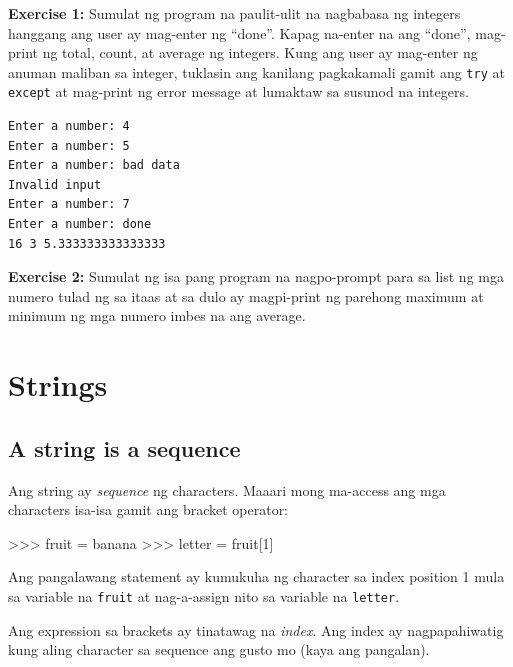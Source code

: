 \documentclass[10pt,]{book}
\newenvironment{Shaded}{}{}
\newcommand{\DecValTok}[1]{\textcolor[rgb]{0.25,0.63,0.44}{#1}}
\newcommand{\NormalTok}[1]{#1}
\newcommand{\OperatorTok}[1]{\textcolor[rgb]{0.40,0.40,0.40}{#1}}
\newcommand{\StringTok}[1]{\textcolor[rgb]{0.25,0.44,0.63}{#1}}
\begin{document}
\textbf{Exercise 1:} Sumulat ng program na paulit-ulit na nagbabasa ng
integers hanggang ang user ay mag-enter ng ``done''. Kapag na-enter na
ang ``done'', mag-print ng total, count, at average ng integers. Kung
ang user ay mag-enter ng anuman maliban sa integer, tuklasin ang
kanilang pagkakamali gamit ang \texttt{try} at \texttt{except} at
mag-print ng error message at lumaktaw sa susunod na integers.

{\small
\begin{verbatim}
Enter a number: 4
Enter a number: 5
Enter a number: bad data
Invalid input
Enter a number: 7
Enter a number: done
16 3 5.333333333333333
\end{verbatim}
}

\textbf{Exercise 2:} Sumulat ng isa pang program na nagpo-prompt para sa
list ng mga numero tulad ng sa itaas at sa dulo ay magpi-print ng
parehong maximum at minimum ng mga numero imbes na ang average.

\chapter{Strings}\label{strings}

\section{A string is a sequence}\label{a-string-is-a-sequence}

  

Ang string ay \emph{sequence} ng characters. Maaari mong ma-access ang
mga characters isa-isa gamit ang bracket operator:

\begin{Shaded}
\begin{Highlighting}[]
\OperatorTok{\textgreater{}\textgreater{}\textgreater{}}\NormalTok{ fruit }\OperatorTok{=} \StringTok{\textquotesingle{}banana\textquotesingle{}}
\OperatorTok{\textgreater{}\textgreater{}\textgreater{}}\NormalTok{ letter }\OperatorTok{=}\NormalTok{ fruit[}\DecValTok{1}\NormalTok{]}
\end{Highlighting}
\end{Shaded}

 \index{}

Ang pangalawang statement ay kumukuha ng character sa index position 1
mula sa variable na \texttt{fruit} at nag-a-assign nito sa variable na
\texttt{letter}.

Ang expression sa brackets ay tinatawag na \emph{index}. Ang index ay
nagpapahiwatig kung aling character sa sequence ang gusto mo (kaya ang
pangalan).
\end{document}
